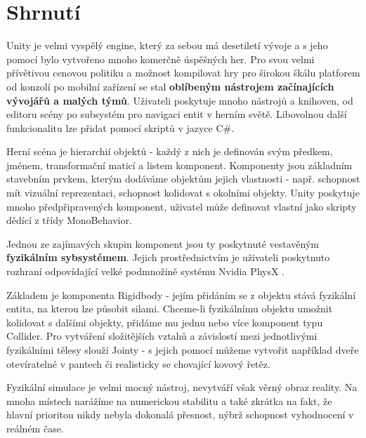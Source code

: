 \section{Shrnutí}

Unity je velmi vyspělý engine, který za sebou má desetiletí vývoje a s jeho pomocí bylo vytvořeno mnoho komerčně úspěšných her. Pro svou velmi přívětivou cenovou politiku a možnost kompilovat hry pro širokou škálu platforem od konzolí po mobilní zařízení se stal \textbf{oblíbeným nástrojem začínajících vývojářů a malých týmů}. Uživateli poskytuje mnoho nástrojů a knihoven, od editoru scény po subsystém pro navigaci entit v herním světě. Libovolnou další funkcionalitu lze přidat pomocí skriptů v jazyce C\#. 

Herní scéna je hierarchií objektů - každý z nich je definován svým předkem, jménem, transformační maticí a listem komponent. Komponenty jsou základním stavebním prvkem, kterým dodáváme objektům jejich vlastnosti - např. schopnost mít vizuální reprezentaci, schopnost kolidovat s okolními objekty. Unity poskytuje mnoho předpřipravených komponent, uživatel může definovat vlastní jako skripty dědící z třídy MonoBehavior.

Jednou ze zajímavých skupin komponent jsou ty poskytnuté vestavěným \textbf{fyzikálním sybsystémem}. Jejich prostřednictvím je uživateli poskytnuto rozhraní odpovídající velké podmnožině systému Nvidia PhysX \cite{PhysX}. 

Základem je komponenta Rigidbody - jejím přidáním se z objektu stává fyzikální entita, na kterou lze působit silami. Chceme-li fyzikálnímu objektu umožnit kolidovat s dalšími objekty, přidáme mu jednu nebo více komponent typu Collider. Pro vytváření složitějších vztahů a závislostí mezi jednotlivými fyzikálními tělesy slouží Jointy - s jejich pomocí můžeme vytvořit například dveře otevíratelné v pantech či realisticky se chovající kovový řetěz.

Fyzikální simulace je velmi mocný nástroj, nevytváří však věrný obraz reality. Na mnoha místech narážíme na numerickou stabilitu a také zkrátka na fakt, že hlavní prioritou nikdy nebyla dokonalá přesnost, nýbrž schopnost vyhodnocení v reálném čase.
